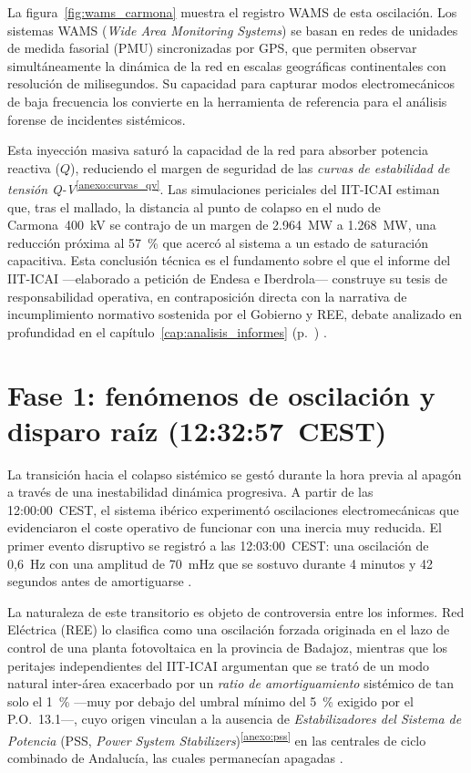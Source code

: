 La figura~\ref{fig:wams_carmona} muestra el registro WAMS de esta
oscilación. Los sistemas WAMS (\textit{Wide Area Monitoring Systems}) se
basan en redes de unidades de medida fasorial (PMU) sincronizadas por GPS,
que permiten observar simultáneamente la dinámica de la red en escalas
geográficas continentales con resolución de milisegundos. Su capacidad
para capturar modos electromecánicos de baja frecuencia los convierte en
la herramienta de referencia para el análisis forense de incidentes
sistémicos.

Esta inyección masiva saturó la capacidad de la red para absorber potencia
reactiva ($Q$), reduciendo el margen de seguridad de las \textit{curvas de
estabilidad de tensión Q-V}\textsuperscript{\ref{anexo:curvas_qv}}.
Las simulaciones periciales del IIT-ICAI estiman que, tras el mallado, la
distancia al punto de colapso en el nudo de Carmona~400~kV se contrajo de
un margen de 2.964~MW a 1.268~MW, una reducción próxima al 57~\% que
acercó al sistema a un estado de saturación capacitiva. Esta conclusión
técnica es el fundamento sobre el que el informe del IIT-ICAI ---elaborado
a petición de Endesa e Iberdrola--- construye su tesis de responsabilidad
operativa, en contraposición directa con la narrativa de incumplimiento
normativo sostenida por el Gobierno y REE, debate analizado en
profundidad en el capítulo~\ref{cap:analisis_informes}
(p.~\pageref{cap:analisis_informes}) \cite{icai2025}.

\clearpage
\section{Fase 1: fenómenos de oscilación y disparo raíz (12:32:57~CEST)}
\label{sec:fase_1_oscilacion_raiz}

La transición hacia el colapso sistémico se gestó durante la hora previa al apagón a través de una inestabilidad dinámica progresiva. A partir de las 12:00:00~CEST, el sistema ibérico experimentó oscilaciones electromecánicas que evidenciaron el coste operativo de funcionar con una inercia muy reducida. El primer evento disruptivo se registró a las 12:03:00~CEST: una oscilación de 0,6~Hz con una amplitud de 70~mHz que se sostuvo durante 4 minutos y 42 segundos antes de amortiguarse \cite{entsoe2025}.

La naturaleza de este transitorio es objeto de controversia entre los
informes. Red Eléctrica (REE) lo clasifica como una oscilación forzada
originada en el lazo de control de una planta fotovoltaica en la
provincia de Badajoz, mientras que los peritajes independientes del
IIT-ICAI argumentan que se trató de un modo natural inter-área
exacerbado por un \textit{ratio de amortiguamiento} sistémico de tan
solo el 1~\% ---muy por debajo del umbral mínimo del 5~\% exigido por
el P.O.~13.1---, cuyo origen vinculan a la ausencia de
\textit{Estabilizadores del Sistema de Potencia} (PSS,
\textit{Power System Stabilizers})\textsuperscript{\ref{anexo:pss}} en las centrales de
ciclo combinado de Andalucía, las cuales permanecían apagadas
\cite{icai2025}.

